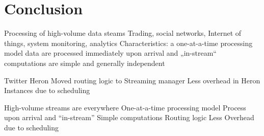 \documentclass[conference]{IEEEtran}
\begin{document}
\section{Conclusion}
\label{sec:Conclusion}

Processing of high-volume data steams
Trading, social networks, Internet of things, system monitoring, analytics
Characteristics:
a one-at-a-time processing model
data are processed immediately upon arrival and „in-stream“ 
computations are simple and generally independent

Twitter Heron 
Moved routing logic to Streaming manager
Less overhead in Heron Instances due to scheduling 

High-volume streams are everywhere
One-at-a-time processing model
Process upon arrival and “in-stream”
Simple computations
Routing logic
Less Overhead due to scheduling




\end{document}
